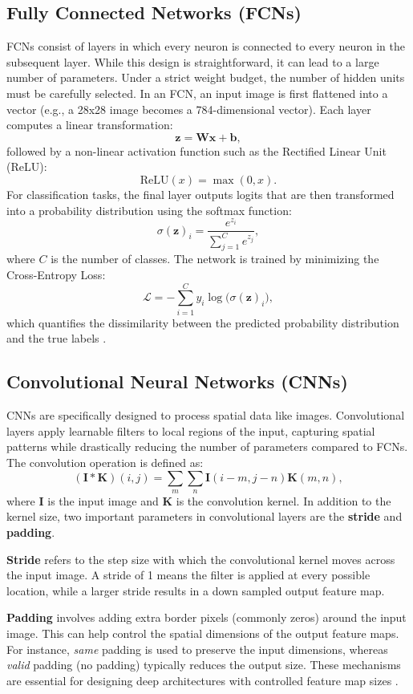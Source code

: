 \documentclass[11pt]{amsart}
\begin{document}
\subsection*{Fully Connected Networks (FCNs)}
FCNs consist of layers in which every neuron is connected to every neuron in the subsequent layer. While this design is straightforward, it can lead to a large number of parameters. Under a strict weight budget, the number of hidden units must be carefully selected. In an FCN, an input image is first flattened into a vector (e.g., a 28x28 image becomes a 784-dimensional vector). Each layer computes a linear transformation:
\[
\mathbf{z} = \mathbf{W}\mathbf{x} + \mathbf{b},
\]
followed by a non-linear activation function such as the Rectified Linear Unit (ReLU):
\[
\text{ReLU}(x) = \max(0, x).
\]
For classification tasks, the final layer outputs logits that are then transformed into a probability distribution using the softmax function:
\[
\sigma(\mathbf{z})_i = \frac{e^{z_i}}{\sum_{j=1}^{C} e^{z_j}},
\]
where \( C \) is the number of classes. The network is trained by minimizing the Cross-Entropy Loss:
\[
\mathcal{L} = -\sum_{i=1}^{C} y_i \log\big(\sigma(\mathbf{z})_i\big),
\]
which quantifies the dissimilarity between the predicted probability distribution and the true labels \cite{Goodfellow-et-al-2016}.

\subsection*{Convolutional Neural Networks (CNNs)}
CNNs are specifically designed to process spatial data like images. Convolutional layers apply learnable filters to local regions of the input, capturing spatial patterns while drastically reducing the number of parameters compared to FCNs. The convolution operation is defined as:
\[
(\mathbf{I} * \mathbf{K})(i,j) = \sum_{m} \sum_{n} \mathbf{I}(i-m, j-n)\mathbf{K}(m, n),
\]
where \(\mathbf{I}\) is the input image and \(\mathbf{K}\) is the convolution kernel. In addition to the kernel size, two important parameters in convolutional layers are the \textbf{stride} and \textbf{padding}. 

\textbf{Stride} refers to the step size with which the convolutional kernel moves across the input image. A stride of 1 means the filter is applied at every possible location, while a larger stride results in a down sampled output feature map. 

\textbf{Padding} involves adding extra border pixels (commonly zeros) around the input image. This can help control the spatial dimensions of the output feature maps. For instance, \emph{same} padding is used to preserve the input dimensions, whereas \emph{valid} padding (no padding) typically reduces the output size. These mechanisms are essential for designing deep architectures with controlled feature map sizes \cite{Goodfellow-et-al-2016}.
\end{document}
